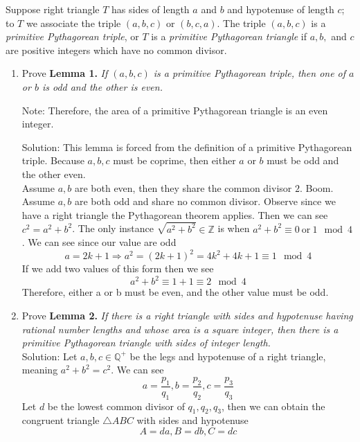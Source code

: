 \documentclass[10pt]{article}
\newcommand{\Z}{\mathbb{Z}}
\newcommand{\Q}{\mathbb{Q}}
\newcommand{\solution}{\color{blue} Solution: \color{black}}
\begin{document}
	
	
	
	Suppose right triangle $T$ has sides of length $a$ and $b$ and hypotenuse of length $c$; to $T$ we associate the triple $(a,b,c)$ or $(b,c,a)$.  
	The triple $(a,b,c)$ is a \emph{primitive Pythagorean triple}, or $T$ is a \emph{primitive Pythagorean triangle} if $a,b,$ and $c$ are positive integers which have no common divisor.  
	
	
	
	\begin{enumerate}
		\item Prove {\bf Lemma 1.} \emph{If $(a,b,c)$ is a primitive Pythagorean triple, then one of $a$ or $b$ is odd and the other is even.}
		
		\textsf{Note:} Therefore, the area of a primitive Pythagorean triangle is an even integer.

        \solution This lemma is forced from the definition of a primitive Pythagorean triple. Because $a,b,c$ must be coprime, then either $a$ or $b$ must be odd and the other even.\\

        Assume $a,b$ are both even, then they share the common divisor $2$. Boom.\\

        Assume $a,b$ are both odd and share no common divisor. Observe since we have a right triangle the Pythagorean theorem applies. Then we can see $c^2 = a^2 + b^2$. The only instance $\sqrt{a^2 + b^2} \in \Z$ is when $a^2 + b^2 \equiv 0 ~\text{or}~ 1 \mod 4$. We can see since our value are odd
        \[a = 2k + 1 \Rightarrow a^2 = (2k + 1)^2 = 4k^2 + 4k + 1 \equiv 1 \mod 4 \]
        If we add two values of this form then we see
        \[a^2 + b^2 \equiv 1 + 1 \equiv 2 \mod 4\]
        Therefore, either a or b must be even, and the other value must be odd.
		
		\item Prove {\bf Lemma 2.}  \emph{If there is a right triangle with sides and hypotenuse having rational number lengths and whose area is a square integer, then there is a primitive Pythagorean triangle with sides of integer length.}\\
            
            \solution Let $a, b, c \in \Q^+$ be the legs and hypotenuse of a right triangle, meaning $a^2 + b^2 = c^2$. We can see
            \[a = \frac{p_1}{q_1}, b = \frac{p_2}{q_2}, c = \frac{p_3}{q_3}\]
            Let $d$ be the lowest common divisor of $q_1, q_2, q_3$, then we can obtain the congruent triangle $\triangle ABC$ with sides and hypotenuse
            \[A = da, B = db, C = dc\]


\end{enumerate}
\end{document}
